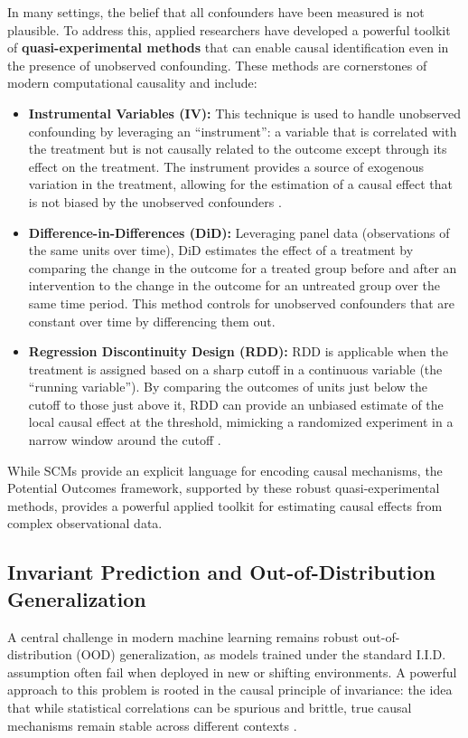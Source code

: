 {In many settings, the belief that all confounders have been measured is not plausible. To address this, applied researchers have developed a powerful toolkit of \textbf{quasi-experimental methods} that can enable causal identification even in the presence of unobserved confounding. These methods are cornerstones of modern computational causality and include:
\begin{itemize}
    \item \textbf{Instrumental Variables (IV):} This technique is used to handle unobserved confounding by leveraging an ``instrument'': a variable that is correlated with the treatment but is not causally related to the outcome except through its effect on the treatment. The instrument provides a source of exogenous variation in the treatment, allowing for the estimation of a causal effect that is not biased by the unobserved confounders \cite{angrist1996identification}.
    \item \textbf{Difference-in-Differences (DiD):} Leveraging panel data (observations of the same units over time), DiD estimates the effect of a treatment by comparing the change in the outcome for a treated group before and after an intervention to the change in the outcome for an untreated group over the same time period. This method controls for unobserved confounders that are constant over time by differencing them out\cite{callaway2021difference}.
    \item \textbf{Regression Discontinuity Design (RDD):} RDD is applicable when the treatment is assigned based on a sharp cutoff in a continuous variable (the ``running variable''). By comparing the outcomes of units just below the cutoff to those just above it, RDD can provide an unbiased estimate of the local causal effect at the threshold, mimicking a randomized experiment in a narrow window around the cutoff \cite{imbens2008regression}.
\end{itemize}

While SCMs provide an explicit language for encoding causal mechanisms, the Potential Outcomes framework, supported by these robust quasi-experimental methods, provides a powerful applied toolkit for estimating causal effects from complex observational data. 

\subsection{Invariant Prediction and Out-of-Distribution Generalization}

A central challenge in modern machine learning remains robust out-of-distribution (OOD) generalization, as models trained under the standard I.I.D. assumption often fail when deployed in new or shifting environments. A powerful approach to this problem is rooted in the causal principle of invariance: the idea that while statistical correlations can be spurious and brittle, true causal mechanisms remain stable across different contexts \cite{pearl2000causality}.

}
